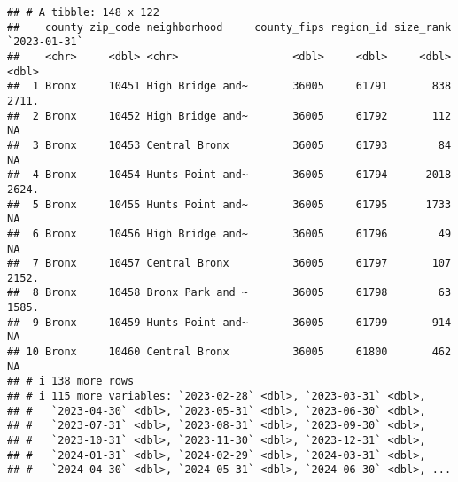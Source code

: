 \documentclass[
]{article}
\begin{document}
\begin{verbatim}
## # A tibble: 148 x 122
##    county zip_code neighborhood     county_fips region_id size_rank `2023-01-31`
##    <chr>     <dbl> <chr>                  <dbl>     <dbl>     <dbl>        <dbl>
##  1 Bronx     10451 High Bridge and~       36005     61791       838        2711.
##  2 Bronx     10452 High Bridge and~       36005     61792       112          NA 
##  3 Bronx     10453 Central Bronx          36005     61793        84          NA 
##  4 Bronx     10454 Hunts Point and~       36005     61794      2018        2624.
##  5 Bronx     10455 Hunts Point and~       36005     61795      1733          NA 
##  6 Bronx     10456 High Bridge and~       36005     61796        49          NA 
##  7 Bronx     10457 Central Bronx          36005     61797       107        2152.
##  8 Bronx     10458 Bronx Park and ~       36005     61798        63        1585.
##  9 Bronx     10459 Hunts Point and~       36005     61799       914          NA 
## 10 Bronx     10460 Central Bronx          36005     61800       462          NA 
## # i 138 more rows
## # i 115 more variables: `2023-02-28` <dbl>, `2023-03-31` <dbl>,
## #   `2023-04-30` <dbl>, `2023-05-31` <dbl>, `2023-06-30` <dbl>,
## #   `2023-07-31` <dbl>, `2023-08-31` <dbl>, `2023-09-30` <dbl>,
## #   `2023-10-31` <dbl>, `2023-11-30` <dbl>, `2023-12-31` <dbl>,
## #   `2024-01-31` <dbl>, `2024-02-29` <dbl>, `2024-03-31` <dbl>,
## #   `2024-04-30` <dbl>, `2024-05-31` <dbl>, `2024-06-30` <dbl>, ...
\end{verbatim}
\end{document}
